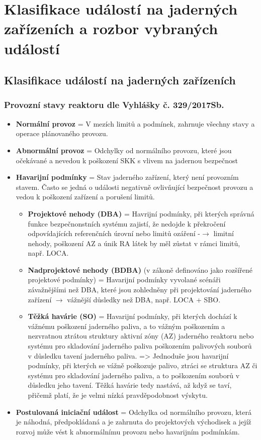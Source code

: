 \section[Klasifikace událostí na jaderných zařízeních]{Klasifikace událostí na jaderných zařízeních a rozbor vybraných událostí}

\subsection{Klasifikace událostí na jaderných zařízeních}

\subsubsection{Provozní stavy reaktoru dle Vyhlášky č. 329/2017Sb.}

\begin{itemize}
	\item \textbf{Normální provoz} = V mezích limitů a podmínek, zahrnuje všechny stavy a operace plánovaného provozu.
	\item \textbf{Abnormální provoz} = Odchylky od normálního provozu, které jsou očekávané a nevedou k poškození SKK s vlivem na jadernou bezpečnost
	\item \textbf{Havarijní podmínky} = Stav jaderného zařízení, který není provozním stavem. Často se jedná o události negativně ovlivňující bezpečnost provozu a vedou k poškození zařízení a porušení limitů.
	
	\begin{itemize}
	    \item \textbf{Projektové nehody (DBA)} = Havrijní podmínky, při kterých správná funkce bezpečnonstních systému zajistí, že nedojde k překročení odpovídajících referenčních úrovní nebo limitů ozáření -$\rightarrow$ limitní nehody, poškození AZ a únik RA látek by měl zůstat v rámci limitů, např. LOCA.
        \item \textbf{Nadprojektové nehody (BDBA)} (v zákoně definováno jako rozšířené projektové podmínky) = Havarijní podmínky vyvolané scénáři závažnějšími než DBA, které jsou zohledněny při projektování jaderného zařízení $\rightarrow$ vážnější důsledky než DBA, např. LOCA + SBO.
        \item \textbf{Těžká havárie (SO)} = Havarijní podmínky, při kterých dochází k vážnému poškození jaderného paliva, a to vážným poškozením a nezvratnou ztrátou struktury aktivní zóny (AZ) jaderného reaktoru nebo systému pro skladování jaderného paliva poškozením palivových souborů v důsledku tavení jaderného paliva. => Jednoduše jsou havarijní podmínky, při kterých se vážně poškozuje palivo, ztráci se struktura AZ či systému pro skladování jaderného paliva, a to poškozením souborů v důsledku jeho tavení. Těžká havárie tedy nastává, až když se taví, přičemž platí, že je velmi nízká pravděpodobnost výskytu. 
	\end{itemize}

    \item \textbf{Postulovaná iniciační událost} = Odchylka od normálního provozu, která je náhodná, předpokládaná a je zahrnuta do projektových východisek a jejíž rozvoj může vést k abnormálnímu provozu nebo havarijním podmínkám.
\end{itemize}

